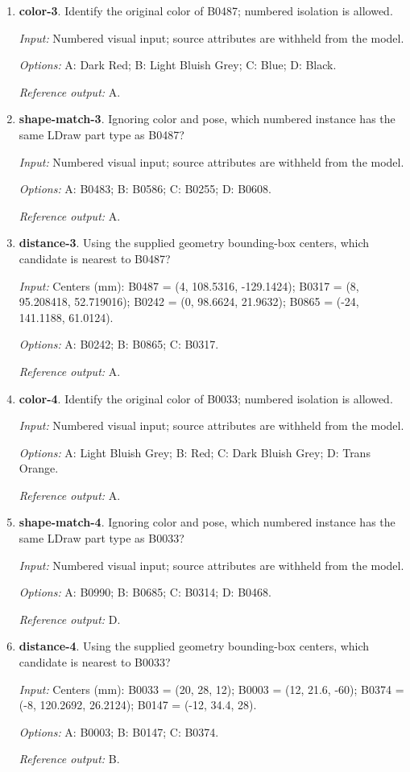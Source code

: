 \begin{enumerate}
\item \textbf{color-3}. Identify the original color of B0487; numbered isolation is allowed.\par {\small \textit{Input:} Numbered visual input; source attributes are withheld from the model. \par\textit{Options:} A: Dark Red; B: Light Bluish Grey; C: Blue; D: Black. \par\textit{Reference output:} A.}
\item \textbf{shape-match-3}. Ignoring color and pose, which numbered instance has the same LDraw part type as B0487?\par {\small \textit{Input:} Numbered visual input; source attributes are withheld from the model. \par\textit{Options:} A: B0483; B: B0586; C: B0255; D: B0608. \par\textit{Reference output:} A.}
\item \textbf{distance-3}. Using the supplied geometry bounding-box centers, which candidate is nearest to B0487?\par {\small \textit{Input:} Centers (mm): B0487 = (4, 108.5316, -129.1424); B0317 = (8, 95.208418, 52.719016); B0242 = (0, 98.6624, 21.9632); B0865 = (-24, 141.1188, 61.0124). \par\textit{Options:} A: B0242; B: B0865; C: B0317. \par\textit{Reference output:} A.}
\item \textbf{color-4}. Identify the original color of B0033; numbered isolation is allowed.\par {\small \textit{Input:} Numbered visual input; source attributes are withheld from the model. \par\textit{Options:} A: Light Bluish Grey; B: Red; C: Dark Bluish Grey; D: Trans Orange. \par\textit{Reference output:} A.}
\item \textbf{shape-match-4}. Ignoring color and pose, which numbered instance has the same LDraw part type as B0033?\par {\small \textit{Input:} Numbered visual input; source attributes are withheld from the model. \par\textit{Options:} A: B0990; B: B0685; C: B0314; D: B0468. \par\textit{Reference output:} D.}
\item \textbf{distance-4}. Using the supplied geometry bounding-box centers, which candidate is nearest to B0033?\par {\small \textit{Input:} Centers (mm): B0033 = (20, 28, 12); B0003 = (12, 21.6, -60); B0374 = (-8, 120.2692, 26.2124); B0147 = (-12, 34.4, 28). \par\textit{Options:} A: B0003; B: B0147; C: B0374. \par\textit{Reference output:} B.}

\end{enumerate}
